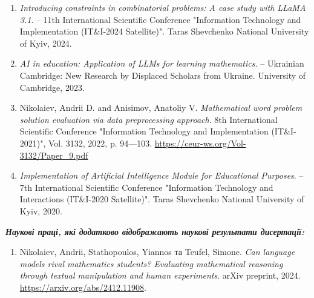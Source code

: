 \begin{enumerate}
    \item \textit{Introducing constraints in combinatorial problems: A case study with LLaMA 3.1}. -- 11th International Scientific Conference "Information Technology and Implementation (IT\&I-2024 Satellite)". Taras Shevchenko National University of Kyiv, 2024.
    \item \textit{AI in education: Application of LLMs for learning mathematics.} -- Ukrainian Cambridge: New Research by Displaced Scholars from Ukraine. University of Cambridge, 2023.
    \item Nikolaiev, Andrii D. and Anisimov, Anatoliy V. \textit{Mathematical word problem solution evaluation via data preprocessing approach}. 8th International Scientific Conference "Information Technology and Implementation (IT\&I-2021)", Vol. 3132, 2022, p. 94—103. \url{https://ceur-ws.org/Vol-3132/Paper_9.pdf} %
    \item \textit{Implementation of Artificial Intelligence Module for Educational Purposes}. -- 7th International Scientific Conference "Information Technology and Interactions (IT\&I-2020 Satellite)". Taras Shevchenko National University of Kyiv, 2020.
\end{enumerate}

\medskip
\textit{\textbf{Наукові праці, які додатково відображають наукові результати дисертації:}}
\medskip
\begin{enumerate}
    \item Nikolaiev, Andrii, Stathopoulos, Yiannos та Teufel, Simone. \textit{Can language models rival mathematics students? Evaluating mathematical reasoning through textual manipulation and human experiments}. arXiv preprint, 2024. \url{https://arxiv.org/abs/2412.11908}.
\end{enumerate}

